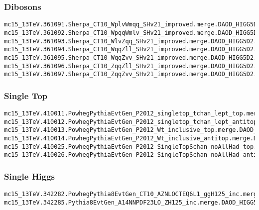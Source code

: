 \begin{scriptsize}
\subsubsection{Dibosons}
\scriptsize

\begin{verbatim}
mc15_13TeV.361091.Sherpa_CT10_WplvWmqq_SHv21_improved.merge.DAOD_HIGG5D2.e4607_s2726_r7772_r7676_p2949
mc15_13TeV.361092.Sherpa_CT10_WpqqWmlv_SHv21_improved.merge.DAOD_HIGG5D2.e4607_s2726_r7772_r7676_p2949
mc15_13TeV.361093.Sherpa_CT10_WlvZqq_SHv21_improved.merge.DAOD_HIGG5D2.e4607_s2726_r7772_r7676_p2949
mc15_13TeV.361094.Sherpa_CT10_WqqZll_SHv21_improved.merge.DAOD_HIGG5D2.e4607_s2726_r7772_r7676_p2949
mc15_13TeV.361095.Sherpa_CT10_WqqZvv_SHv21_improved.merge.DAOD_HIGG5D2.e4607_s2726_r7772_r7676_p2949
mc15_13TeV.361096.Sherpa_CT10_ZqqZll_SHv21_improved.merge.DAOD_HIGG5D2.e4607_s2726_r7772_r7676_p2949
mc15_13TeV.361097.Sherpa_CT10_ZqqZvv_SHv21_improved.merge.DAOD_HIGG5D2.e4607_s2726_r7772_r7676_p2949
\end{verbatim}


\subsubsection{Single Top}
\fontsize{7}{9} \selectfont%
\begin{verbatim}
mc15_13TeV.410011.PowhegPythiaEvtGen_P2012_singletop_tchan_lept_top.merge.DAOD_HIGG5D2.e3824_s2608_s2183_r7725_r7676_p2949
mc15_13TeV.410012.PowhegPythiaEvtGen_P2012_singletop_tchan_lept_antitop.merge.DAOD_HIGG5D2.e3824_s2608_s2183_r7725_r7676_p2949
mc15_13TeV.410013.PowhegPythiaEvtGen_P2012_Wt_inclusive_top.merge.DAOD_HIGG5D2.e3753_s2608_s2183_r7725_r7676_p2949
mc15_13TeV.410014.PowhegPythiaEvtGen_P2012_Wt_inclusive_antitop.merge.DAOD_HIGG5D2.e3753_s2608_s2183_r7725_r7676_p2949
mc15_13TeV.410025.PowhegPythiaEvtGen_P2012_SingleTopSchan_noAllHad_top.merge.DAOD_HIGG5D2.e3998_s2608_s2183_r7725_r7676_p2949
mc15_13TeV.410026.PowhegPythiaEvtGen_P2012_SingleTopSchan_noAllHad_antitop.merge.DAOD_HIGG5D2.e3998_s2608_s2183_r7725_r7676_p2949
\end{verbatim}

\subsubsection{Single Higgs}
\begin{verbatim}
mc15_13TeV.342282.PowhegPythia8EvtGen_CT10_AZNLOCTEQ6L1_ggH125_inc.merge.DAOD_HIGG5D2.e4850_a766_a821_r7676_p2949
mc15_13TeV.342285.Pythia8EvtGen_A14NNPDF23LO_ZH125_inc.merge.DAOD_HIGG5D2.e4246_s2608_s2183_r7772_r7676_p2949
\end{verbatim}


\end{scriptsize}
